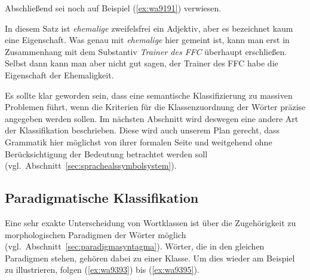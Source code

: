 Abschließend sei noch auf Beispiel (\ref{ex:wa9191}) verwiesen.

\begin{exe}
\end{exe}

In diesem Satz ist \textit{ehemalige} zweifelsfrei ein Adjektiv, aber es bezeichnet kaum eine Eigenschaft.
Was genau mit \textit{ehemalige} hier gemeint ist, kann man erst in Zusammenhang mit dem Substantiv \textit{Trainer des FFC} überhaupt erschließen.
Selbst dann kann man aber nicht gut sagen, der Trainer des FFC habe die Eigenschaft der Ehemaligkeit.

Es sollte klar geworden sein, dass eine semantische Klassifizierung zu massiven Problemen führt, wenn die Kriterien für die Klassenzuordnung der Wörter präzise angegeben werden sollen.
Im nächsten Abschnitt wird deswegen eine andere Art der Klassifikation beschrieben.
Diese wird auch unserem Plan gerecht, dass Grammatik hier möglichst von ihrer formalen Seite und weitgehend ohne Berücksichtigung der Bedeutung betrachtet werden soll (vgl.\ Abschnitt~\ref{sec:sprachealssymbolsystem}).

\subsection{Paradigmatische Klassifikation}

\label{sec:paradigmatischeklassifikation}

Eine sehr exakte Unterscheidung von Wortklassen ist über die Zugehörigkeit zu morphologischen Paradigmen der Wörter möglich (vgl.\ Abschnitt~\ref{sec:paradigmasyntagma}).
Wörter, die in den gleichen Paradigmen stehen, gehören dabei zu einer Klasse.
Um dies wieder am Beispiel zu illustrieren, folgen (\ref{ex:wa9393}) bis (\ref{ex:wa9395}).

